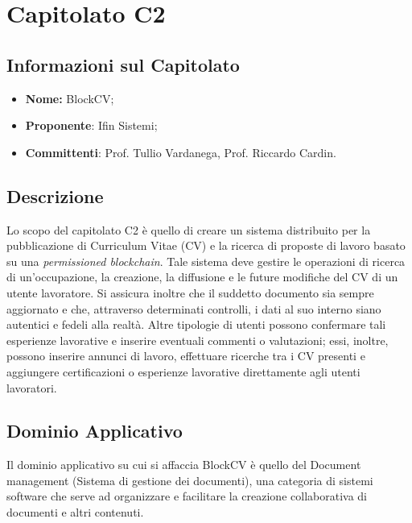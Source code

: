 \section{Capitolato C2}
\subsection{Informazioni sul Capitolato}
  \begin{itemize}
    \item \textbf{Nome:}
    BlockCV;
    \item \textbf{Proponente}:
    Ifin Sistemi;
    \item \textbf{Committenti}:
    Prof. Tullio Vardanega, Prof. Riccardo Cardin.
  \end{itemize}

\subsection{Descrizione}
  Lo scopo del capitolato C2 è quello di creare un sistema distribuito per la pubblicazione di Curriculum Vitae (CV) e la ricerca di proposte di lavoro basato su una \textit{permissioned blockchain}. Tale sistema deve gestire le operazioni di ricerca di un'occupazione, la creazione, la diffusione e le future modifiche del CV di un utente lavoratore. Si assicura inoltre che il suddetto documento sia sempre aggiornato e che, attraverso determinati controlli, i dati al suo interno siano autentici e fedeli alla realtà.
  \newline \newline Altre tipologie di utenti possono confermare tali esperienze lavorative e inserire eventuali commenti o valutazioni; essi, inoltre, possono inserire annunci di lavoro, effettuare ricerche tra i CV presenti e aggiungere certificazioni o esperienze lavorative direttamente agli utenti lavoratori.

\subsection{Dominio Applicativo}
  Il dominio applicativo su cui si affaccia BlockCV è quello del Document management (Sistema di gestione dei documenti), una categoria di sistemi software che serve ad organizzare e facilitare la creazione collaborativa di documenti e altri contenuti.

